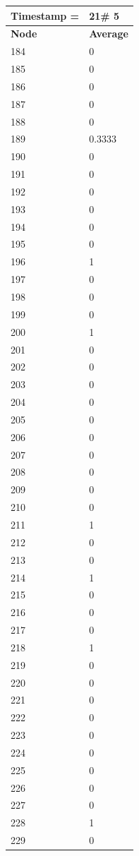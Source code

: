 \begin{tabular}{|l||l|}
\hline
\textbf{Timestamp =} & \textbf{21}\# 5\\\hline
	\textbf{Node} & \textbf{Average} \\ \hline
\hline
	184 & 0 \\ \hline
	185 & 0 \\ \hline
	186 & 0 \\ \hline
	187 & 0 \\ \hline
	188 & 0 \\ \hline
	189 & 0.3333 \\ \hline
	190 & 0 \\ \hline
	191 & 0 \\ \hline
	192 & 0 \\ \hline
	193 & 0 \\ \hline
	194 & 0 \\ \hline
	195 & 0 \\ \hline
	196 & 1 \\ \hline
	197 & 0 \\ \hline
	198 & 0 \\ \hline
	199 & 0 \\ \hline
	200 & 1 \\ \hline
	201 & 0 \\ \hline
	202 & 0 \\ \hline
	203 & 0 \\ \hline
	204 & 0 \\ \hline
	205 & 0 \\ \hline
	206 & 0 \\ \hline
	207 & 0 \\ \hline
	208 & 0 \\ \hline
	209 & 0 \\ \hline
	210 & 0 \\ \hline
	211 & 1 \\ \hline
	212 & 0 \\ \hline
	213 & 0 \\ \hline
	214 & 1 \\ \hline
	215 & 0 \\ \hline
	216 & 0 \\ \hline
	217 & 0 \\ \hline
	218 & 1 \\ \hline
	219 & 0 \\ \hline
	220 & 0 \\ \hline
	221 & 0 \\ \hline
	222 & 0 \\ \hline
	223 & 0 \\ \hline
	224 & 0 \\ \hline
	225 & 0 \\ \hline
	226 & 0 \\ \hline
	227 & 0 \\ \hline
	228 & 1 \\ \hline
	229 & 0 \\ \hline
\end{tabular}
